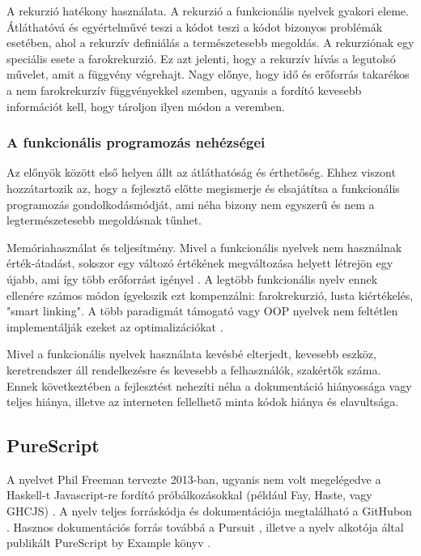 \documentclass[12pt]{article}
\begin{document}
A rekurzió hatékony használata. A rekurzió a funkcionális nyelvek gyakori eleme. Átláthatóvá és egyértelművé teszi a kódot teszi a kódot bizonyos problémák esetében, ahol a rekurzív definiálás a természetesebb megoldás. A rekurziónak egy speciális esete a farokrekurzió. Ez azt jelenti, hogy a rekurzív hívás a legutolsó művelet, amit a függvény végrehajt. Nagy előnye, hogy idő és erőforrás takarékos a nem farokrekurzív függvényekkel szemben, ugyanis a fordító kevesebb információt kell, hogy tároljon ilyen módon a veremben.

\subsubsection{A funkcionális programozás nehézségei}

Az előnyök között első helyen állt az átláthatóság és érthetőség. Ehhez viszont hozzátartozik az, hogy a fejlesztő előtte megismerje és elsajátítsa a funkcionális programozás gondolkodásmódját, ami néha bizony nem egyszerű és nem a legtermészetesebb megoldásnak tűnhet.

Memóriahasználat és teljesítmény. Mivel a funkcionális nyelvek nem használnak érték-átadást, sokszor egy változó értékének megváltozása helyett létrejön egy újabb, ami így több erőforrást igényel \cite{JN}. A legtöbb funkcionális nyelv ennek ellenére számos módon ígyekszik ezt kompenzálni: farokrekurzió, lusta kiértékelés, "smart linking". A több paradigmát támogató vagy OOP nyelvek nem feltétlen implementálják ezeket az optimalizációkat \cite{JN}.

Mivel a funkcionális nyelvek használata kevésbé elterjedt, kevesebb eszköz, keretrendszer áll rendelkezésre és kevesebb a felhasználók, szakértők száma. Ennek következtében a fejlesztést nehezíti néha a dokumentáció hiányossága vagy teljes hiánya, illetve az interneten fellelhető minta kódok hiánya és elavultsága.

\subsection{PureScript}

A nyelvet Phil Freeman tervezte 2013-ban, ugyanis nem volt megelégedve a Haskell-t Javascript-re fordító próbálkozásokkal (például Fay, Haste, vagy GHCJS) \cite{pd}. A nyelv teljes forráskódja és dokumentációja megtalálható a GitHubon \cite{pgit}. Hasznos dokumentációs forrás továbbá a Pursuit \cite{purs}, illetve a nyelv alkotója által publikált PureScript by Example könyv \cite{PE}.
\end{document}
